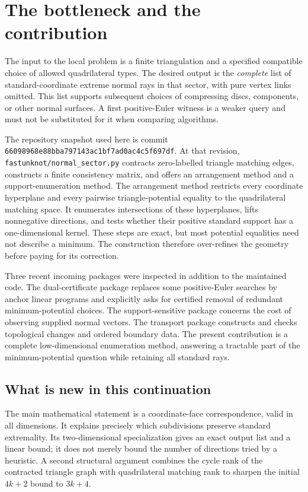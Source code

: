 \documentclass[11pt]{article}
\theoremstyle{definition}
\theoremstyle{remark}
\begin{document}
\section{The bottleneck and the contribution}
\label{sec:introduction}

The input to the local problem is a finite triangulation and a specified
compatible choice of allowed quadrilateral types. The desired output is the
\emph{complete} list of standard-coordinate extreme normal rays in that
sector, with pure vertex links omitted. This list supports subsequent choices
of compressing discs, components, or other normal surfaces. A first
positive-Euler witness is a weaker query and must not be substituted for it
when comparing algorithms.

The repository snapshot used here is commit
\texttt{66098968e88bba797143ac1bf7ad0ac4c5f697df}. At that revision,
\texttt{fastunknot/normal\_sector.py} contracts zero-labelled triangle matching
edges, constructs a finite consistency matrix, and offers an arrangement method
and a support-enumeration method. The arrangement method restricts every
coordinate hyperplane and every pairwise triangle-potential equality to the
quadrilateral matching space. It enumerates intersections of these hyperplanes,
lifts nonnegative directions, and tests whether their positive standard support
has a one-dimensional kernel. These steps are exact, but most potential
equalities need not describe a minimum. The construction therefore over-refines
the geometry before paying for its correction.\cite{repo,report57}

Three recent incoming packages were inspected in addition to the maintained
code. The dual-certificate package replaces some positive-Euler searches by
anchor linear programs and explicitly asks for certified removal of redundant
minimum-potential choices. The support-sensitive package concerns the cost of
observing supplied normal vectors. The transport package constructs and checks
topological changes and ordered boundary data. The present contribution is a
complete low-dimensional enumeration method, answering a tractable part of the
minimum-potential question while retaining all standard rays.\cite{incomingdual,
incomingsupport,incomingtransport}

\subsection{What is new in this continuation}

The main mathematical statement is a coordinate-face correspondence, valid in
all dimensions. It explains precisely which subdivisions preserve standard
extremality. Its two-dimensional specialization gives an exact output list and
a linear bound; it does not merely bound the number of directions tried by a
heuristic. A second structural argument combines the cycle rank of the
contracted triangle graph with quadrilateral matching rank to sharpen the
initial $4k+2$ bound to $3k+4$.
\end{document}
